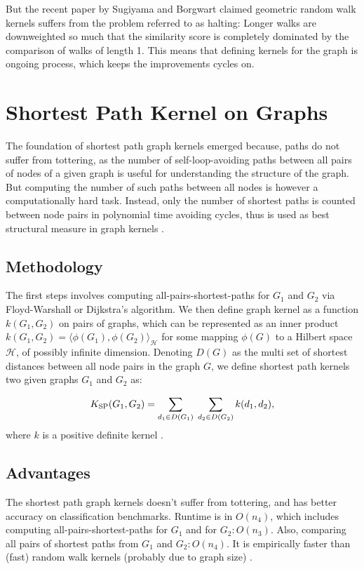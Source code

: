 But the recent paper by  Sugiyama and Borgwart \citep{Sugiyama2015} claimed geometric random walk kernels suffers from the problem  referred to as halting: Longer walks are downweighted so much that the similarity score is completely dominated by the comparison of walks of length 1. This means that defining kernels for the graph is ongoing process, which keeps the improvements cycles on.

\section{Shortest Path Kernel on Graphs}

The foundation of shortest path graph kernels emerged because, paths do not suffer from tottering, as the number of self-loop-avoiding paths between all pairs of nodes of a given graph is useful for understanding the structure of the graph. But computing the number of such paths between all nodes is however a computationally hard task. Instead, only the number of shortest paths is counted  between node pairs in polynomial time avoiding cycles, thus is used as best structural measure in graph kernels \citep{Kriegel2005}.

\subsection{Methodology}
The first steps involves computing all-pairs-shortest-paths for $G_{1}$ and $G_{2}$ via Floyd-Warshall or Dijkstra’s algorithm. We then define graph kernel as a function $k(G_1,G_2)$ on pairs of graphs, which can be represented as an inner product $k(G_1,G_2) = \langle \phi(G_1), \phi(G_2) \rangle_{\mathcal{H}}$ for some mapping $\phi(G)$ to a Hilbert space $\mathcal{H}$, of possibly infinite dimension. Denoting $D(G)$ as the multi set of shortest distances between all node pairs in the graph $G$, we define  shortest path kernels two given graphs $G_1$ and $G_2$ as:

%
\begin{align}
K_{\rm SP}(G_{1}, G_{2})
=\sum_{d_1\in D(G_{1})}\;\sum_{d_2\in D(G_{2})}k(d_1,d_2),
\label{eq:SPKernel}
\end{align}
%
where $k$ is a positive definite kernel \citep{Borgwardt2005, Kriegel2005}.

\subsection{Advantages}
The shortest path graph kernels doesn't suffer  from tottering, and has  better accuracy on classification benchmarks. Runtime is in $O(n_{4})$, which includes computing all-pairs-shortest-paths for $G_{1}$ and  for $G_{2} \colon O(n_{3})$. Also, comparing all pairs of shortest paths from $G_{1}$ and  $G_{2} \colon O(n_{4})$. It is empirically faster than (fast) random walk kernels (probably due to graph size) \citep{Kriegel2005}.

